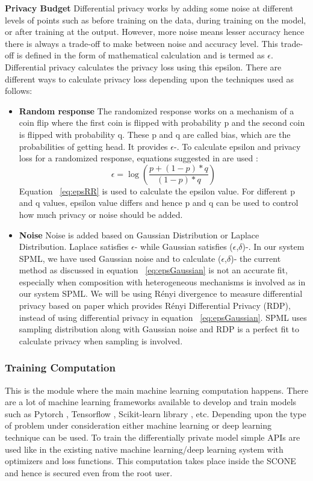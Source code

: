 \textbf{Privacy Budget}
Differential privacy works by adding some noise at different levels of points such as before training on the data, during training on the model, or after training at the output. However, more noise means lesser accuracy hence there is always a trade-off to make between noise and accuracy level. This trade-off is defined in the form of mathematical calculation and is termed as $\epsilon$. Differential privacy calculates the privacy loss using this epsilon. There are different ways to calculate privacy loss depending upon the techniques used as follows:
\begin{itemize}
\item \textbf{Random response}
The randomized response works on a mechanism of a coin flip where the first coin is flipped with probability p and the second coin is flipped with probability q. These p and q are called bias, which are the probabilities of getting head. It provides $\epsilon$-. To calculate epsilon and privacy loss for a randomized response, equations suggested in \cite{18} are used :
\begin{equation}
\epsilon = \log({\frac{p + (1 - p) * q}{(1 - p) * q}})
\label{eq:epsRR}
\end{equation}
Equation ~\ref{eq:epsRR} is used to calculate the epsilon value. For different p and q values, epsilon value differs and hence p and q can be used to control how much privacy or noise should be added.
\item \textbf{Noise}
Noise is added based on Gaussian Distribution or Laplace Distribution. Laplace satisfies $\epsilon$- while Gaussian satisfies ($\epsilon$,$\delta$)-. In our system SPML, we have used Gaussian noise and to calculate ($\epsilon$,$\delta$)- the current method as discussed in equation ~\ref{eq:epsGaussian} is not an accurate fit, especially when composition with heterogeneous mechanisms is involved \cite{4} as in our system SPML. We will be using Rényi divergence to measure differential privacy based on paper \cite{23} which provides Rényi Differential Privacy (RDP), instead of using differential privacy in equation ~\ref{eq:epsGaussian}. SPML uses sampling distribution along with Gaussian noise and RDP is a perfect fit to calculate privacy when sampling is involved.
\end{itemize}
\subsubsection{Training Computation}
This is the module where the main machine learning computation happens. There are a lot of machine learning frameworks available to develop and train models such as Pytorch \cite{75}, Tensorflow \cite{24}, Scikit-learn library \cite{62}, etc. Depending upon the type of problem under consideration either machine learning or deep learning technique can be used. To train the differentially private model simple APIs are used like in the existing native machine learning/deep learning system with optimizers and loss functions. This computation takes place inside the SCONE and hence is secured even from the root user.

